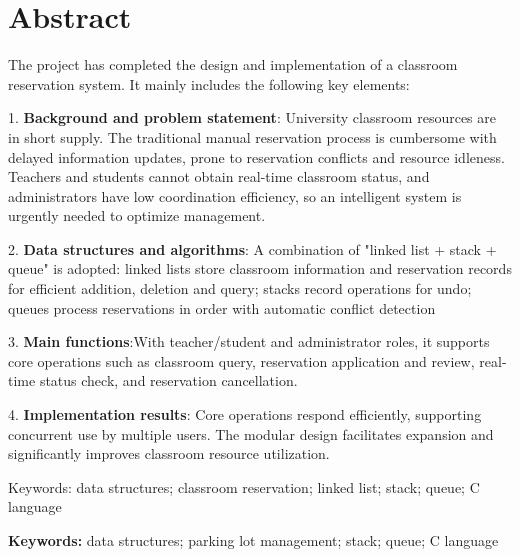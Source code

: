 \documentclass[a4paper,12pt,twoside]{ctexrep}
\begin{document}
\chapter*{Abstract}
\thispagestyle{empty}

The project has completed the design and implementation of a classroom reservation system. It mainly includes the following key elements:

1. \textbf{Background and problem statement}: University classroom resources are in short supply. The traditional manual reservation process is cumbersome with delayed information updates, prone to reservation conflicts and resource idleness. Teachers and students cannot obtain real-time classroom status, and administrators have low coordination efficiency, so an intelligent system is urgently needed to optimize management.

2. \textbf{Data structures and algorithms}: A combination of "linked list + stack + queue" is adopted: linked lists store classroom information and reservation records for efficient addition, deletion and query; stacks record operations for undo; queues process reservations in order with automatic conflict detection

3. \textbf{Main functions}:With teacher/student and administrator roles, it supports core operations such as classroom query, reservation application and review, real-time status check, and reservation cancellation.

4. \textbf{Implementation results}: Core operations respond efficiently, supporting concurrent use by multiple users. The modular design facilitates expansion and significantly improves classroom resource utilization.

Keywords: data structures; classroom reservation; linked list; stack; queue; C language

\vspace{1cm}

\noindent\textbf{Keywords:} data structures; parking lot management; stack; queue; C language

\newpage

\pagestyle{fancy}
\tableofcontents
\thispagestyle{plain}


\clearpage
\pagestyle{fancy}
\setcounter{page}{1}
\end{document}
